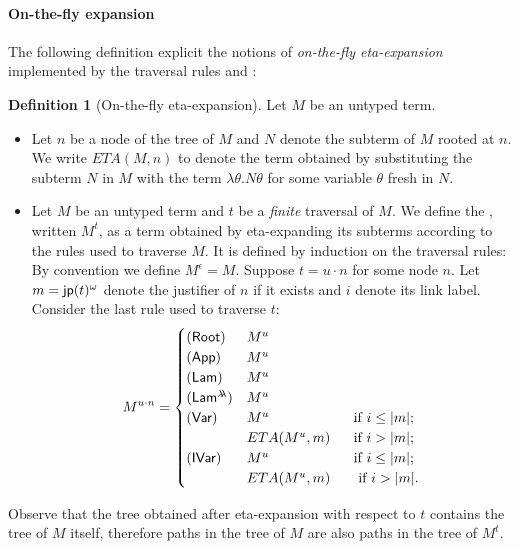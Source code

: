 \documentclass{article}
\theoremstyle{definition}
\newtheorem{definition}{Definition}[section]
\newcommand{\ghostlmd}{{\lambda\!\!\lambda}}
\begin{document}
\paragraph{On-the-fly expansion}
The following definition explicit the notions of \emph{on-the-fly eta-expansion} implemented by the
traversal rules  and :

\begin{definition}[On-the-fly eta-expansion]
\label{def:onthefly_etaexpansion}
Let $M$ be an untyped term.
\begin{itemize}
\item Let $n$ be a node of the tree of $M$ and $N$ denote the subterm of $M$ rooted at $n$. We write $ETA(M, n)$ to denote the term obtained by substituting
the subterm $N$ in $M$ with the term $\lambda \theta. N \theta$ for some variable $\theta$ fresh in $N$.

\item Let $M$ be an untyped term and $t$ be a \emph{finite} traversal of $M$. We define the , written $M^t$, as a term obtained by eta-expanding its subterms according to the rules used to traverse $M$. It is defined by induction on the traversal rules: By convention we define $M^\epsilon = M$. Suppose $t = u \cdot n$ for some node $n$. Let $m = {\sf jp}(t)^\omega$ denote the justifier of $n$ if it exists and $i$ denote its link label.  Consider the last rule used to traverse $t$:
\begin{equation}
M^{u \cdot n} =
\begin{cases}
    \rulename{Root} &  M^{u} \\
    \rulename{App} &  M^{u} \\
    \rulename{Lam} &  M^{u} \\
    \rulename{Lam^\ghostlmd} & M^{u} \\
    \rulename{Var} &  M^{u} \hfill \mbox{if $i \leq |m|$; } \\
                   & ETA(M^{u}, m) \hfill  \mbox{if $i > |m|$; } \\
    \rulename{IVar} &  M^{u} \hfill \mbox{if $i \leq |m|$; } \\
                   & ETA(M^{u}, m) \qquad \hfill \mbox{if $i > |m|$.}
\end{cases}
\end{equation}
\end{itemize}
\end{definition}
Observe that the tree obtained after eta-expansion with respect to $t$ contains the tree of $M$ itself, therefore paths in the tree of $M$ are also paths in the tree of $M^t$.
\end{document}
